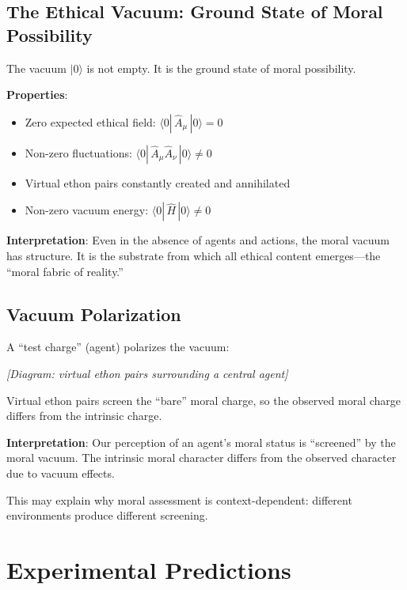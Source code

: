 \documentclass[12pt]{article}
\begin{document}
\subsection{The Ethical Vacuum: Ground State of Moral Possibility}

The vacuum $|0\rangle$ is not empty. It is the ground state of moral possibility.

\textbf{Properties}:
\begin{itemize}
    \item Zero expected ethical field: $\langle 0| \,\hat{A}_\mu\, |0\rangle = 0$
    \item Non-zero fluctuations: $\langle 0| \,\hat{A}_\mu \hat{A}_\nu\, |0\rangle \neq 0$
    \item Virtual ethon pairs constantly created and annihilated
    \item Non-zero vacuum energy: $\langle 0| \,\hat{H}\, |0\rangle \neq 0$
\end{itemize}

\textbf{Interpretation}: Even in the absence of agents and actions, the moral vacuum has structure. It is the substrate from which all ethical content emerges---the ``moral fabric of reality.''

\subsection{Vacuum Polarization}

A ``test charge'' (agent) polarizes the vacuum:

\begin{center}
\emph{[Diagram: virtual ethon pairs surrounding a central agent]}
\end{center}

Virtual ethon pairs screen the ``bare'' moral charge, so the observed moral charge differs from the intrinsic charge.

\textbf{Interpretation}: Our perception of an agent's moral status is ``screened'' by the moral vacuum. The intrinsic moral character differs from the observed character due to vacuum effects.

This may explain why moral assessment is context-dependent: different environments produce different screening.

\section{Experimental Predictions}
\end{document}
